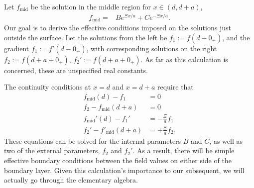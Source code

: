 Let $f_{\text{mid}}$ be the solution in the middle region for $x\in(d,d+a)$,   
    \begin{align}
      f_{\text{mid}} %
      =& Be^{\Xi x/a} + C e^{-\Xi x/a}.
    \end{align}
    Our goal is to derive the effective conditions imposed on the solutions just outside the surface.
    Let the solutions from the left be $f_1:=f(d-0_+)$, and the gradient $f_1:=f'(d-0_+)$,
    with corresponding solutions on the right $f_2:=f(d+a+0_+)$, $f_2':=f(d+a+0_+)$.  As far as this 
    calculation is concerned, these are unspecified real constants. 

    The continuity conditions at $x=d$ and $x=d+a$ require that
    \begin{subequations}
      \begin{align}
        f_{\text{mid}}(d)-f_1 &= 0\\
        f_2- f_{\text{mid}}(d+a)&= 0\\
        f_{\text{mid}}'(d) -f_1'&= -\frac{\Xi}{a} f_1\\
        f_2' -f'_{\text{mid}}(d+a)&= +\frac{\Xi}{a} f_2.
      \end{align}
    \end{subequations}
   These equations can be solved for the internal parameters $B$ and $C$, as well as two of the external 
   parameters, $f_2$ and $f_2'$.  As a result, there will be simple effective boundary conditions between
   the field values on either side of the boundary layer.  
   Given this calculation's importance to our subsequent, we will actually go through the elementary algebra.  

